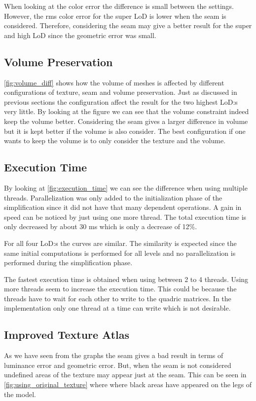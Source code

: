 When looking at the color error the difference is small between the settings. However, the rms color error for the super LoD is lower when the seam is considered. Therefore, considering the seam may give a better result for the super and high LoD since the geometric error was small.

\subsection{Volume Preservation} \label{sec:discussion_volume}
\cref{fig:volume_diff} shows how the volume of meshes is affected by different configurations of texture, seam and volume preservation. Just as discussed in previous sections the configuration affect the result for the two highest LoD:s very little. By looking at the figure we can see that the volume constraint indeed keep the volume better. Considering the seam gives a larger difference in volume but it is kept better if the volume is also consider. The best configuration if one wants to keep the volume is to only consider the texture and the volume.

\subsection{Execution Time} \label{sec:discussion_time}
By looking at \cref{fig:execution_time} we can see the difference when using multiple threads. Parallelization was only added to the initialization phase of the simplification since it did not have that many dependent operations. A gain in speed can be noticed by just using one more thread. The total execution time is only decreased by about 30 ms which is only a decrease of 12\%.

For all four LoD:s the curves are similar. The similarity is expected since the same initial computations is performed for all levels and no parallelization is performed during the simplification phase.

The fastest execution time is obtained when using between 2 to 4 threads. Using more threads seem to increase the execution time. This could be because the threads have to wait for each other to write to the quadric matrices. In the implementation only one thread at a time can write which is not desirable.


\subsection{Improved Texture Atlas} \label{sec:discussion_texture}
As we have seen from the graphs the seam gives a bad result in terms of luminance error and geometric error. But, when the seam is not considered undefined areas of the texture may appear just at the seam. This can be seen in \cref{fig:using_original_texture} where where black areas have appeared on the legs of the model.

